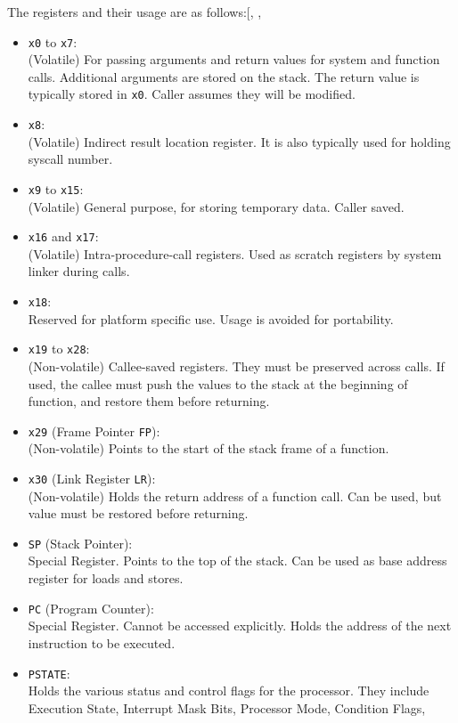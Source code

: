 \documentclass[a4paper, nobind]{templates/ociamthesis}
\providecommand{\tightlist}{%
  \setlength{\itemsep}{0pt}\setlength{\parskip}{0pt}}
\begin{document}
The registers and their usage are as follows:{[}, , \citeproc{ref-arm-pcs}{7}{]}

\begin{itemize}
\tightlist
\item
  \texttt{x0} to \texttt{x7}:\\
  (Volatile) For passing arguments and return values for system and function calls.
  Additional arguments are stored on the stack.
  The return value is typically stored in \texttt{x0}. Caller assumes they will be modified.
\item
  \texttt{x8}:\\
  (Volatile) Indirect result location register. It is also typically used for holding
  syscall number.
\item
  \texttt{x9} to \texttt{x15}:\\
  (Volatile) General purpose, for storing temporary data. Caller saved.
\item
  \texttt{x16} and \texttt{x17}:\\
  (Volatile) Intra-procedure-call registers. Used as scratch
  registers by system linker during calls.
\item
  \texttt{x18}:\\
  Reserved for platform specific use. Usage is avoided for portability.
\item
  \texttt{x19} to \texttt{x28}:\\
  (Non-volatile) Callee-saved registers. They must be preserved across calls.
  If used, the callee must push the values to the stack at the beginning of function,
  and restore them before returning.
\item
  \texttt{x29} (Frame Pointer \texttt{FP}):\\
  (Non-volatile) Points to the start of the stack frame of a function.
\item
  \texttt{x30} (Link Register \texttt{LR}):\\
  (Non-volatile) Holds the return address of a function call.
  Can be used, but value must be restored before returning.
\item
  \texttt{SP} (Stack Pointer):\\
  Special Register. Points to the top of the stack.
  Can be used as base address register for loads and stores.
\item
  \texttt{PC} (Program Counter):\\
  Special Register. Cannot be accessed explicitly.
  Holds the address of the next instruction to be executed.
\item
  \texttt{PSTATE}:\\
  Holds the various status and control flags for the processor.
  They include Execution State, Interrupt Mask Bits, Processor Mode, Condition Flags,
\end{itemize}
\end{document}
